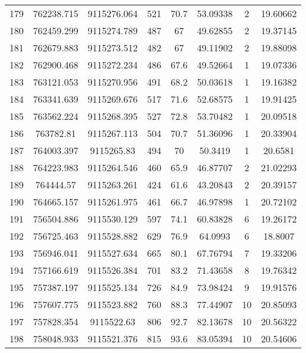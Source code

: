 \begin{longtable}{cccccccc}
179  & 762238.715      & 9115276.064      & 521     & 70.7  & 53.09338 & 2  & 19.60662 \\
180  & 762459.299      & 9115274.789      & 487     & 67    & 49.62855 & 2  & 19.37145 \\
181  & 762679.883      & 9115273.512      & 482     & 67    & 49.11902 & 2  & 19.88098 \\
182  & 762900.468      & 9115272.234      & 486     & 67.6  & 49.52664 & 1  & 19.07336 \\
183  & 763121.053      & 9115270.956      & 491     & 68.2  & 50.03618 & 1  & 19.16382 \\
184  & 763341.639      & 9115269.676      & 517     & 71.6  & 52.68575 & 1  & 19.91425 \\
185  & 763562.224      & 9115268.395      & 527     & 72.8  & 53.70482 & 1  & 20.09518 \\
186  & 763782.81       & 9115267.113      & 504     & 70.7  & 51.36096 & 1  & 20.33904 \\
187  & 764003.397      & 9115265.83       & 494     & 70    & 50.3419  & 1  & 20.6581  \\
188  & 764223.983      & 9115264.546      & 460     & 65.9  & 46.87707 & 2  & 21.02293 \\
189  & 764444.57       & 9115263.261      & 424     & 61.6  & 43.20843 & 2  & 20.39157 \\
190  & 764665.157      & 9115261.975      & 461     & 66.7  & 46.97898 & 1  & 20.72102 \\
191  & 756504.886      & 9115530.129      & 597     & 74.1  & 60.83828 & 6  & 19.26172 \\
192  & 756725.463      & 9115528.882      & 629     & 76.9  & 64.0993  & 6  & 18.8007  \\
193  & 756946.041      & 9115527.634      & 665     & 80.1  & 67.76794 & 7  & 19.33206 \\
194  & 757166.619      & 9115526.384      & 701     & 83.2  & 71.43658 & 8  & 19.76342 \\
195  & 757387.197      & 9115525.134      & 726     & 84.9  & 73.98424 & 9  & 19.91576 \\
196  & 757607.775      & 9115523.882      & 760     & 88.3  & 77.44907 & 10 & 20.85093 \\
197  & 757828.354      & 9115522.63       & 806     & 92.7  & 82.13678 & 10 & 20.56322 \\
198  & 758048.933      & 9115521.376      & 815     & 93.6  & 83.05394 & 10 & 20.54606 \\

\end{longtable}
